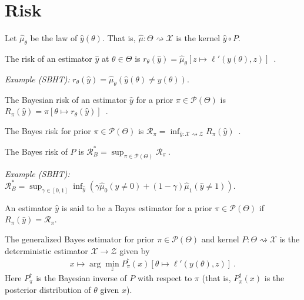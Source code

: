 \section{Risk}

Let $\hat{\mu}_\theta$ be the law of $\hat{y}(\theta)$. That is, $\hat{\mu} : \mathcal \Theta \rightsquigarrow \mathcal X$ is the kernel $\hat{y} \circ P$.

\begin{definition}[Risk]
  \label{def:risk}
  The risk of an estimator $\hat{y}$ at $\theta \in \Theta$ is $r_\theta(\hat{y}) = \hat{\mu}_\theta\left[z \mapsto \ell'(y(\theta), z)\right]$~.
\end{definition}

\emph{Example (SBHT):} $r_\theta(\hat{y}) = \hat{\mu}_\theta(\hat{y}(\theta) \ne y(\theta))$.


\begin{definition}
  \label{def:bayesianRisk}
  The Bayesian risk of an estimator $\hat{y}$ for a prior $\pi \in \mathcal P(\Theta)$ is $R_\pi(\hat{y}) = \pi\left[\theta \mapsto r_\theta(\hat{y})\right]$~.
\end{definition}


\begin{definition}
  \label{def:bayesRisk}
  The Bayes risk for prior $\pi \in \mathcal P(\Theta)$ is $\mathcal R_\pi = \inf_{\hat{y} : \mathcal X \rightsquigarrow \mathcal Z} R_\pi(\hat{y})$~.

  The Bayes risk of $P$ is $\mathcal R^*_B = \sup_{\pi \in \mathcal P(\Theta)} \mathcal R_\pi \: .$
\end{definition}

\emph{Example (SBHT):} $\mathcal R^*_B = \sup_{\gamma \in [0,1]}\inf_{\hat{y}}\left(\gamma \hat{\mu}_0(\hat{y} \ne 0) + (1 - \gamma) \hat{\mu}_1(\hat{y} \ne 1)\right)$.

\begin{definition}
  \label{def:bayesEstimator}
  An estimator $\hat{y}$ is said to be a Bayes estimator for a prior $\pi \in \mathcal P(\Theta)$ if $R_\pi(\hat{y}) = \mathcal R_\pi$.
\end{definition}

\begin{definition}
  \label{def:genBayesEstimator}
  The generalized Bayes estimator for prior $\pi \in \mathcal P(\Theta)$ and kernel $P: \Theta \rightsquigarrow \mathcal X$ is the deterministic estimator $\mathcal X \to \mathcal Z$ given by
  \begin{align*}
  x \mapsto \arg\min_z P_\pi^\dagger(x)\left[\theta \mapsto \ell'(y(\theta), z)\right] \: .
  \end{align*}
  Here $P_\pi^\dagger$ is the Bayesian inverse of $P$ with respect to $\pi$ (that is, $P_\pi^\dagger(x)$ is the posterior distribution of $\theta$ given $x$).
\end{definition}

